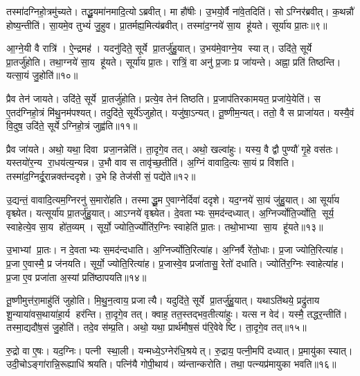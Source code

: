 तस्मा॑दग्निहो॒त्रमु॑च्यते।
तद्धू॒यमा॑नमादि॒त्योऽब्रवीत्।
मा हौ॑षीः।
उ॒भयो॒र्वै ना॑वे॒तदिति॑।
सोऽग्निर॑ब्रवीत्।
क॒थन्नौ॑ होष्य॒न्तीति॑।
सा॒यमे॒व तुभ्यं॑ जु॒हुव\sn{}।
प्रा॒तर्मह्य॒मित्य॑ब्रवीत्।
तस्मा॑द॒ग्नये॑ सा॒य हू॑यते।
सूर्या॑य प्रा॒तः॥९॥

आ॒ग्ने॒यी वै रात्रि॑।
ऐ॒न्द्रमह॑।
यदनु॑दिते॒ सूर्ये प्रा॒तर्जु॑हु॒यात्।
उ॒भय॑मे॒वाग्ने॒य स्यात्।
उदि॑ते॒ सूर्ये प्रा॒तर्जु॑होति।
तथा॒ग्नये॑ सा॒य हू॑यते।
सूर्या॑य प्रा॒तः।
रात्रिं॒ वा अनु॑ प्र॒जाः प्र जा॑यन्ते।
अह्ना॒ प्रति॑ तिष्ठन्ति।
यत्सा॒यं जु॒होति॑॥१०॥

प्रैव तेन॑ जायते।
उदि॑ते॒ सूर्ये प्रा॒तर्जु॑होति।
प्रत्ये॒व तेन॑ तिष्ठति।
प्र॒जाप॑तिरकामयत॒ प्रजा॑ये॒येति॑।
स ए॒तद॑ग्निहो॒त्रं मि॑थु॒नम॑पश्यत्।
तदुदि॑ते॒ सूर्ये॑ऽजुहोत्।
यजु॑षा॒ऽन्यत्।
तू॒ष्णीम॒न्यत्।
ततो॒ वै स प्राजा॑यत।
यस्यै॒वं वि॒दुष॒ उदि॑ते॒ सूर्येऽग्निहो॒त्रं जुह्व॑ति॥११॥

प्रैव जा॑यते।
अथो॒ यथा॒ दिवा प्रजा॒नन्नेति॑।
ता॒दृगे॒व तत्।
अथो॒ खल्वा॑हुः।
यस्य॒ वै द्वौ पुण्यौ॑ गृ॒हे वस॑तः।
यस्तयो॑र॒न्य रा॒धय॑त्य॒न्यन्न।
उ॒भौ वाव स तावृ॑च्छ॒तीति॑।
अ॒ग्निं वावादि॒त्यः सा॒यं प्र वि॑शति।
तस्मा॑द॒ग्निर्दू॒रान्नक्त॑न्ददृशे।
उ॒भे हि तेज॑सी सं॒ पद्ये॑ते॥१२॥

उ॒द्यन्तं॒ वावादि॒त्यम॒ग्निरनु॑ स॒मारो॑हति।
तस्माद्धू॒म ए॒वाग्नेर्दिवा॑ ददृशे।
यद॒ग्नये॑ सा॒यं जु॑हु॒यात्।
आ सूर्या॑य वृश्च्येत।
यत्सूर्या॑य प्रा॒तर्जु॑हु॒यात्।
आऽग्नये॑ वृश्च्येत।
दे॒वताभ्यः स॒मद॑न्दध्यात्।
अ॒ग्निर्ज्योति॒र्ज्योति॒ सूर्य॒ स्वाहेत्ये॒व सा॒य हो॑त॒व्यम्।
सूर्यो॒ ज्योति॒र्ज्योति॑र॒ग्निः स्वाहेति॑ प्रा॒तः।
तथो॒भाभ्या सा॒य हू॑यते॥१३॥

उ॒भाभ्यां प्रा॒तः।
न दे॒वताभ्यः स॒मद॑न्दधाति।
अ॒ग्निर्ज्योति॒रित्या॑ह।
अ॒ग्निर्वै रे॑तो॒धाः।
प्र॒जा ज्योति॒रित्या॑ह।
प्र॒जा ए॒वास्मै॒ प्र ज॑नयति।
सूर्यो॒ ज्योति॒रित्या॑ह।
प्र॒जास्वे॒व प्रजा॑तासु॒ रेतो॑ दधाति।
ज्योति॑र॒ग्निः स्वाहेत्या॑ह।
प्र॒जा ए॒व प्रजा॑ता अ॒स्यां प्रति॑ष्ठापयति॥१४॥

तू॒ष्णीमुत्त॑रा॒माहु॑तिं जुहोति।
मि॒थु॒न॒त्वाय॒ प्रजात्यै।
यदुदि॑ते॒ सूर्ये प्रा॒तर्जु॑हु॒यात्।
यथाऽति॑थये॒ प्रद्रु॑ताय शू॒न्याया॑वस॒थाया॑हा॒र्य हर॑न्ति।
ता॒दृगे॒व तत्।
क्वाह॒ तत॒स्तद्भव॒तीत्या॑हुः।
यत्स न वेद॑।
यस्मै॒ तद्धर॒न्तीति॑।
तस्मा॒द्यदौ॑ष॒सं जु॒होति॑।
तदे॒व स॑म्प्र॒ति।
अथो॒ यथा॒ प्रार्थ॑मौष॒सं प॑रि॒वेवेष्टि।
ता॒दृगे॒व तत्॥१५॥\anuvakamend[अ॒मृ॒ष्ट॒ वि॒चि॒कित्स॑ति॒ जुह्व॑त्य॒जाम॑सृजताग्निहो॒त्र सूर्या॑य प्रा॒तर्जु॒होति॒ जुह्व॑ति सं॒पद्ये॑ते हूयते स्थापयति सम्प्र॒ति द्वे च॑]

रु॒द्रो वा ए॒षः।
यद॒ग्निः।
पत्नी स्था॒ली।
यन्मध्ये॒ऽग्नेर॑धि॒श्रयेत्।
रु॒द्राय॒ पत्नी॒मपि॑ दध्यात्।
प्र॒मायु॑का स्यात्।
उदी॒चोऽङ्गा॑रान्नि॒रूह्याधि॑ श्रयति।
पत्नि॑यै गोपी॒थाय॑।
व्य॑न्तान्करोति।
तथा॒ पत्न्यप्र॑मायुका भवति॥१६॥

